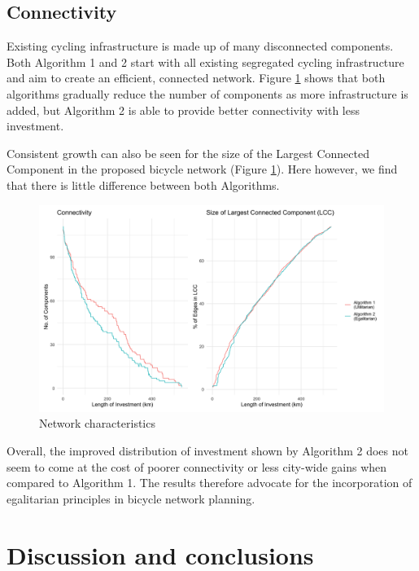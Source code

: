 \documentclass[
]{article}
\begin{document}
\hypertarget{connectivity}{%
\subsection{Connectivity}\label{connectivity}}

Existing cycling infrastructure is made up of many disconnected
components. Both Algorithm 1 and 2 start with all existing segregated
cycling infrastructure and aim to create an efficient, connected
network. Figure \ref{fig:componentsandGCC} shows that both algorithms
gradually reduce the number of components as more infrastructure is
added, but Algorithm 2 is able to provide better connectivity with less
investment.

Consistent growth can also be seen for the size of the Largest Connected
Component in the proposed bicycle network (Figure
\ref{fig:componentsandGCC}). Here however, we find that there is little
difference between both Algorithms.

\begin{figure}[H]

{\centering \includegraphics[width=0.85\linewidth]{data/Manchester/Plots/Growth_Results/growth_util_egal_components_gcc_components_together_Manchester} 

}

\caption{Network characteristics}\label{fig:componentsandGCC}
\end{figure}

Overall, the improved distribution of investment shown by Algorithm 2 does not seem to come at the cost
of poorer connectivity or less city-wide gains when compared to Algorithm 1.
The results therefore advocate for the incorporation of egalitarian principles in bicycle network planning.

\hypertarget{discussion-and-conclusions}{%
\section{Discussion and conclusions}\label{discussion-and-conclusions}}
\end{document}
